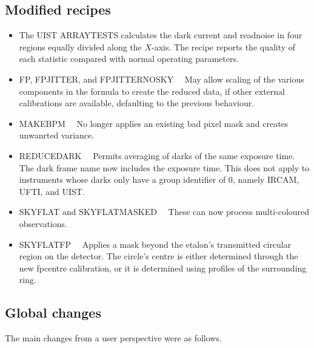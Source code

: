 \documentclass[twoside,11pt]{article}
\newcommand{\htmlref}[2]{#1}
\renewcommand{\_}{\texttt{\symbol{95}}}
\begin{document}
\subsection{Modified recipes}
\begin{itemize}
  \item The UIST ARRAY\_TESTS calculates the dark current and readnoise
    in four regions equally divided along the $X$-axis.  The recipe
    reports the quality of each statistic compared with normal
    operating parameters.
  \item \htmlref{FP}{FP}, \htmlref{FP\_JITTER}{FP\_JITTER}, and 
    \htmlref{FP\_JITTER\_NO\_SKY}{FP\_JITTER\_NO\_SKY}~~
    May allow scaling of the various components in the formula to create
    the reduced data, if other external calibrations are available,
    defaulting to the previous behaviour.
  \item \htmlref{MAKE\_BPM}{MAKE\_BPM}~~
    No longer applies an existing bad pixel mask and creates unwanrted
    variance.
  \item \htmlref{REDUCE\_DARK}{REDUCE\_DARK}~~
    Permits averaging of darks of the same exposure time.  The dark
    frame name now includes the exposure time.  This does not apply
    to instruments whose darks only have a group identifier of 0,
    namely IRCAM, UFTI, and UIST.
  \item \htmlref{SKY\_FLAT}{SKY\_FLAT} and \htmlref{SKY\_FLAT\_MASKED}{SKY\_FLAT\_MASKED}~~
    These can now process multi-coloured observations.
  \item \htmlref{SKY\_FLAT\_FP}{SKY\_FLAT\_FP}~~
    Applies a mask beyond the etalon's transmitted circular region
    on the detector.  The circle's centre is either determined through
    the new fpcentre calibration, or it is determined using profiles of
    the surrounding ring.
\end{itemize}

\subsection{Global changes}

The main changes from a user perspective were as follows.
\end{document}
